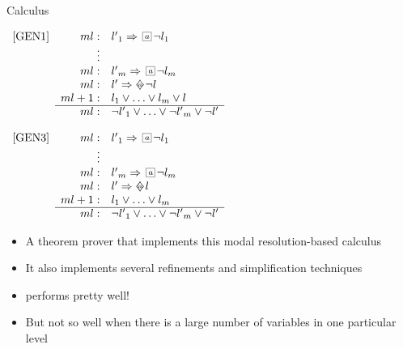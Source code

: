 \documentclass[10pt]{beamer}
\begin{document}
\begin{frame}{Calculus}
    \scriptsize
\begin{minipage}[t]{0.48\linewidth}
    $
    \begin{array}{lrl}
        \mbox{[GEN1]} & ml: & {l'}_1  \then  \nec{a}\neg l_1 \\
                  & \qquad \vdots  \\
                  & ml: & {l'}_m  \then  \nec{a}\neg l_m \\
                  & ml: & l'  \then  \pos{a}\neg  l \\
                  & ml + 1:  & l_1 \lor \ldots \lor l_m \lor l \\  \cline{2-3}
                  & ml:  & \neg {l'}_1 \lor \ldots \lor \neg {l'}_m \lor \neg l'
    \end{array} 
    $
\end{minipage}\hfill
\begin{minipage}[t]{0.48\linewidth}
    $
    \begin{array}{lrl}
       \mbox{[GEN3]} & ml : & {l'}_1 \then  \nec{a}\neg l_1 \\
                & \qquad \vdots  \\
                & ml : & {l'}_m  \then  \nec{a}\neg l_m \\
                & ml : & l'  \then \pos{a}  l \\
                & ml + 1 : & l_1 \lor \ldots \lor l_m  \\  \cline{2-3}
                & ml : & \neg {l'}_1 \lor \ldots \lor \neg {l'}_m \lor \neg l'
    \end{array}
    $
\end{minipage}
\end{frame}

\begin{frame}{\ksp}
    \begin{itemize}
        \item A theorem prover that implements this modal resolution-based calculus
        \item It also implements several refinements and simplification techniques
        \item \ksp performs pretty well!
        \item But not so well when there is a large number of variables in one particular level
    \end{itemize}

\end{frame}
\end{document}
